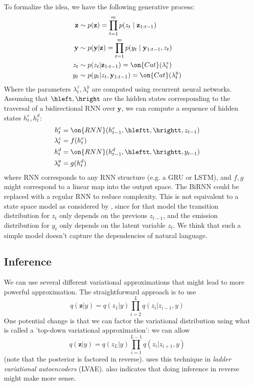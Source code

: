 \documentclass[12pt]{article}
\theoremstyle{definition}
\theoremstyle{remark}
\renewcommand{\v}[1]{\mathbf{#1}}
\begin{document}
To formalize the idea, we have the following generative process:
\begin{align}
	\v z &\sim p(\v z) = \prod_{t = 1}^m p(z_t \mid \v z_{1:t-1}) \\
	\v y &\sim p(\v y | \v z) = \prod_{t = 1}^m p(y_t \mid \v y_{1:t-1}, z_t) \\
	z_t &\sim p(z_t | \v z_{1:t-1}) = \on{Cat}(\lambda^z_t) \\ 
	y_t &\sim p(y_t | z_{t}, \v y_{1:t-1}) = \on{Cat}(\lambda^y_t)
\end{align}
Where the parameters $\lambda^z_t, \lambda^y_t$ are computed using recurrent neural networks. Assuming that $\v \hleft, \v \hright$ are the hidden states corresponding to the traversal of a bidirectional RNN over $\v y$, we can compute a sequence of hidden states $h^e_t, h^d_t$: 
\begin{align*}
	h^e_t &= \on{RNN}(h^e_{t - 1}, \hleftt, \hrightt, z_{t - 1}) \\
	\lambda^z_t &= f(h^e_t) \\
	h^d_t &= \on{RNN}(h^d_{t - 1}, \hleftt, \hrightt, y_{t - 1}) \\
	\lambda^y_t &= g(h^d_t)
\end{align*}
where RNN corresponds to any RNN structure (e.g. a GRU or LSTM), and $f, g$ might correspond to a linear map into the output space. The BiRNN could be replaced with a regular RNN to reduce complexity. This is not equivalent to a state space model as considered by \citep{krishnan2017structured}, since for that model the transition distribution for $z_t$ only depends on the previous $z_{t-1}$, and the emission distribution for $y_t$ only depends on the latent variable $z_t$. We think that such a simple model doesn't capture the dependencies of natural language.

\subsection*{Inference}

We can use several different variational approximations that might lead to more powerful approximation. The straightforward approach is to use 
$$q(\v z | y) = q(z_1 | y)\prod_{i = 2}^{L} q(z_i | z_{i - 1}, y)$$
One potential change is that we can factor the variational distribution using what is called a 'top-down variational approximation': we can allow 
$$q(\v z | y) = q(z_L | y)\prod_{i = 1}^{L - 1} q(z_i | z_{i + 1}, y)$$
(note that the posterior is factored in reverse). \citet{sonderby2016ladder} uses this technique in \emph{ladder variational autoencoders} (LVAE). \citet{krishnan2017structured} also indicates that doing inference in reverse might make more sense.
\end{document}
